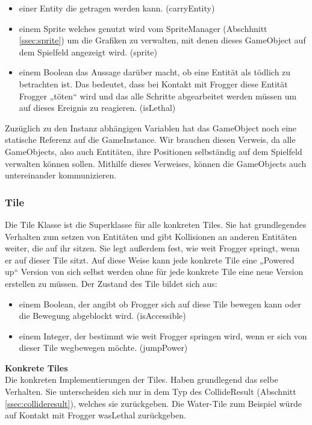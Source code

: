 \documentclass[a4paper,10pt]{report}
\begin{document}
{{{				\begin{itemize}
					\item einer Entity die getragen werden kann. (carryEntity)
					\item einem Sprite welches genutzt wird vom SpriteManager (Abschhnitt \ref{ssec:sprite}) um die Grafiken zu verwalten, mit denen dieses GameObject auf dem Spielfeld angezeigt wird. (sprite)
					\item einem Boolean das Aussage darüber macht, ob eine Entität als tödlich zu betrachten ist. Das bedeutet, dass bei Kontakt mit Frogger diese Entität Frogger „töten“ wird 
						  und das alle Schritte abgearbeitet werden müssen um auf dieses Ereignis zu reagieren. (isLethal)
				\end{itemize}
				\noindent
				Zuzüglich zu den Instanz abhängigen Variablen hat das GameObject noch eine statische Referenz auf die GameInstance. 				
				Wir brauchen diesen Verweis, da alle GameObjects, also auch Entitäten, ihre Positionen selbständig auf dem Spielfeld verwalten können sollen. 
				Mithilfe dieses Verweises, können die GameObjects auch untereinander kommunizieren.
			}
			
			\subsubsection{Tile}
			{
				\label{sssec:tileclass}
				
				Die Tile Klasse ist die Superklasse für alle konkreten Tiles. Sie hat grundlegendes Verhalten zum setzen von Entitäten und gibt Kollisionen an anderen Entitäten weiter, die auf ihr sitzen.
				Sie legt außerdem fest, wie weit Frogger springt, wenn er auf dieser Tile sitzt. 
				Auf diese Weise kann jede konkrete Tile eine „Powered up“ Version von sich selbst werden ohne für jede konkrete Tile eine neue Version erstellen zu müssen.
				\newline \newline
				Der Zustand des Tile bildet sich aus:
				
				\begin{itemize}
					\item einem Boolean, der angibt ob Frogger sich auf diese Tile bewegen kann oder die Bewegung abgeblockt wird. (isAccessible)
					\item einem Integer, der bestimmt wie weit Frogger springen wird, wenn er sich von dieser Tile wegbewegen möchte. (jumpPower)
				\end{itemize}				
				\noindent
				\textbf{Konkrete Tiles} \\
				Die konkreten Implementierungen der Tiles. Haben grundlegend das selbe Verhalten. Sie unterscheiden sich nur in dem Typ des CollideResult (Abschnitt \ref{ssec:collideresult}), welches sie zurückgeben. 
				Die Water-Tile zum Beispiel würde auf Kontakt mit Frogger wasLethal zurückgeben.	
			}			
			\newpage 		
}}
\end{document}
